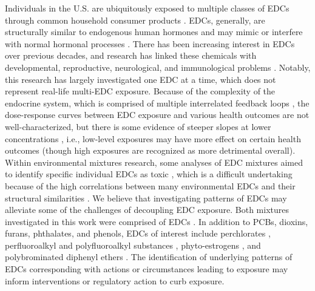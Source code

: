 Individuals in the U.S. are ubiquitously exposed to multiple classes of EDCs through common household consumer products \citep{gore2015edc}. EDCs, generally, are structurally similar to endogenous human hormones and may mimic or interfere with normal hormonal processes \citep{zoeller2012endocrine}. There has been increasing interest in EDCs over previous decades, and research has linked these chemicals with developmental, reproductive, neurological, and immunological problems \citep{solomon2000environment, meeker2012exposure, kabir2015review}. Notably, this research has largely investigated one EDC at a time, which does not represent real-life multi-EDC exposure. Because of the complexity of the endocrine system, which is comprised of multiple interrelated feedback loops \citep{diamanti2009endocrine}, the dose-response curves between EDC exposure and various health outcomes are not well-characterized, but there is some evidence of steeper slopes at lower concentrations \citep{vandenberg2012hormones}, i.e., low-level exposures may have more effect on certain health outcomes (though high exposures are recognized as more detrimental overall). Within environmental mixtures research, some analyses of EDC mixtures aimed to identify specific individual EDCs as toxic \citep{tanner2020early, loftus2021exposure}, which is a difficult undertaking because of the high correlations between many environmental EDCs and their structural similarities \citep{kavlock1996research}. We believe that investigating patterns of EDCs may alleviate some of the challenges of decoupling EDC exposure. Both mixtures investigated in this work were comprised of EDCs \citep{gore2015edc, van1998toxic}. In addition to PCBs, dioxins, furans, phthalates, and phenols, EDCs of interest include perchlorates \citep{nizinski2020perchlorate}, perfluoroalkyl and polyfluoroalkyl substances \citep{pfaswebsite}, phyto-estrogens \citep{yilmaz2020endocrine}, and polybrominated diphenyl ethers \citep{gibson2018effects}. The identification of underlying patterns of EDCs corresponding with actions or circumstances leading to exposure may inform interventions or regulatory action to curb exposure.

